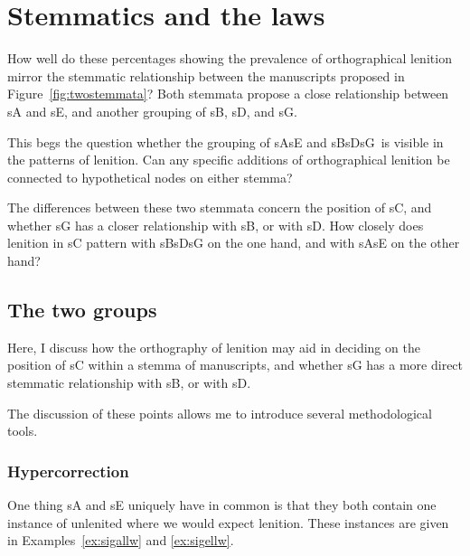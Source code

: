 \section{Stemmatics and the laws}
\label{sec:stemmatics-laws}


How well do these percentages showing the prevalence of orthographical lenition mirror the stemmatic relationship between the manuscripts proposed in Figure~\ref{fig:twostemmata}? Both stemmata propose a close relationship between \gls{sA} and \gls{sE}, and another grouping of \gls{sB}, \gls{sD}, and \gls{sG}.

This begs the question whether the grouping of \gls{sA}\gls{sE} and \gls{sB}\gls{sD}\gls{sG}\ is visible in the patterns of lenition. Can any specific additions of orthographical lenition be connected to hypothetical nodes on either stemma?

The differences between these two stemmata concern the position of \gls{sC}, and whether \gls{sG} has a closer relationship with \gls{sB}, or with \gls{sD}. How closely does lenition in \gls{sC} pattern with \gls{sB}\gls{sD}\gls{sG} on the one hand, and with \gls{sA}\gls{sE} on the other hand?  



\subsection{The two groups}
\label{sec:two-groups}
Here, I discuss how the orthography of lenition may aid in deciding on the position of \gls{sC} within a stemma of manuscripts, and whether \gls{sG} has a more direct stemmatic relationship with \gls{sB}, or with \gls{sD}.

The discussion of these points allows me to introduce several methodological tools.
\subsubsection{Hypercorrection}
\label{sec:hypercorrection}


One thing \gls{sA} and \gls{sE} uniquely have in common is that they both contain one instance of unlenited  where we would expect lenition. These instances are given in Examples~\ref{ex:sigallw} and \ref{ex:sigellw}.
\begin{mwl}
\end{mwl}


